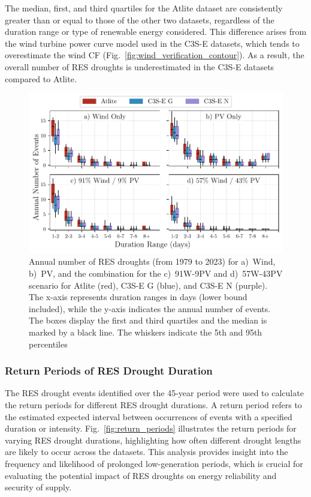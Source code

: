 \documentclass[preprint, 12pt, authoryear]{elsarticle}
\begin{document}
The median, first, and third quartiles for the Atlite dataset are consistently greater than or equal to those of the other two datasets, regardless of the duration range or type of renewable energy considered. This difference arises from the wind turbine power curve model used in the C3S-E datasets, which tends to overestimate the wind CF (Fig.~\ref{fig:wind_verification_contour}). As a result, the overall number of RES droughts is underestimated in the C3S-E datasets compared to Atlite. 

\begin{figure}[!ht]
	\centering
	\includegraphics[width=\textwidth]{droughts_number_events.pdf}
	\caption{Annual number of RES droughts (from 1979 to 2023) for a)~Wind, b)~PV, and the combination for the c)~91W-9PV and d)~57W-43PV scenario for Atlite (red), C3S-E G (blue), and C3S-E N (purple). The x-axis represents duration ranges in days (lower bound included), while the y-axis indicates the annual number of events. The boxes display the first and third quartiles and the median is marked by a black line. The whiskers indicate the 5th and 95th percentiles}
	\label{fig:boxplot_number_events}	
\end{figure}

\newpage
\subsubsection{Return Periods of RES Drought Duration}

The RES drought events identified over the 45-year period were used to calculate the return periods for different RES drought durations. A return period refers to the estimated expected interval between occurrences of events with a specified duration or intensity. Fig.~\ref{fig:return_periods} illustrates the return periods for varying RES drought durations, highlighting how often different drought lengths are likely to occur across the datasets. This analysis provides insight into the frequency and likelihood of prolonged low-generation periods, which is crucial for evaluating the potential impact of RES droughts on energy reliability and security of supply.
\end{document}
